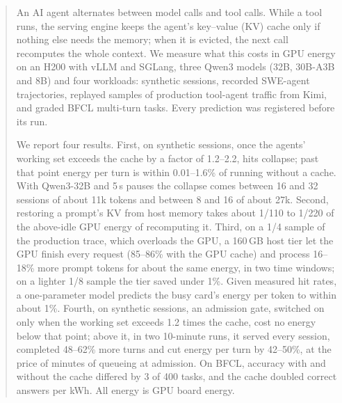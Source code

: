\begin{abstract}
An AI agent alternates between model calls and tool calls. While a tool runs, the serving engine keeps the agent's
key--value (KV) cache only if nothing else needs the memory; when it is evicted, the next call recomputes the whole
context. We measure what this costs in GPU energy on an H200 with vLLM and SGLang, three Qwen3 models (32B, 30B-A3B
and 8B) and four workloads: synthetic sessions, recorded SWE-agent trajectories, replayed samples of production
tool-agent traffic from Kimi, and graded BFCL multi-turn tasks. Every prediction was registered before its run.

We report four results. First, on synthetic sessions, once the agents' working set exceeds the cache by a factor of 1.2--2.2, hits collapse;
past that point energy per turn is within 0.01--1.6\% of running without a cache. With
Qwen3-32B and 5\,s pauses the collapse comes between 16 and 32 sessions of about 11k tokens and between 8 and 16 of
about 27k. Second, restoring a prompt's KV from host memory takes about 1/110 to 1/220 of the above-idle GPU energy of
recomputing it. Third, on a 1/4 sample of the production trace, which overloads the GPU, a 160\,GB host tier let the GPU
finish every request (85--86\% with the GPU cache) and process 16--18\% more prompt tokens for about the same energy, in two
time windows; on a lighter 1/8 sample the tier saved under 1\%. Given measured hit rates, a one-parameter model predicts the busy card's energy per
token to within about 1\%. Fourth, on synthetic sessions, an admission gate, switched on only when the working set
exceeds 1.2 times the cache, cost no energy below that point; above it, in two 10-minute runs, it served every session,
completed 48--62\% more turns and cut energy per turn by 42--50\%, at the price of minutes of queueing at
admission. On BFCL, accuracy with and without the cache differed by 3 of 400 tasks, and the
cache doubled correct answers per kWh. All energy is GPU board energy.
\end{abstract}
